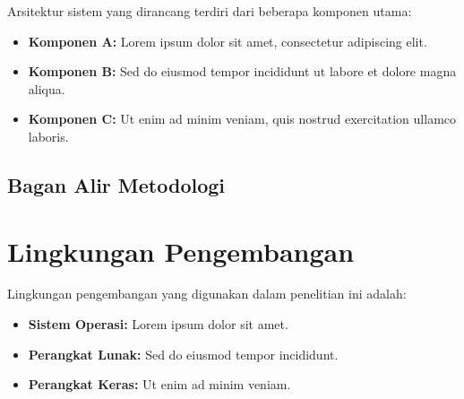 
Arsitektur sistem yang dirancang terdiri dari beberapa komponen utama:

\begin{itemize}
    \item \textbf{Komponen A:} Lorem ipsum dolor sit amet, consectetur adipiscing elit.
    \item \textbf{Komponen B:} Sed do eiusmod tempor incididunt ut labore et dolore magna aliqua.
    \item \textbf{Komponen C:} Ut enim ad minim veniam, quis nostrud exercitation ullamco laboris.
\end{itemize}


\subsection{Bagan Alir Metodologi}



\section{Lingkungan Pengembangan}


Lingkungan pengembangan yang digunakan dalam penelitian ini adalah:

\begin{itemize}
    \item \textbf{Sistem Operasi:} Lorem ipsum dolor sit amet.
    \item \textbf{Perangkat Lunak:} Sed do eiusmod tempor incididunt.
    \item \textbf{Perangkat Keras:} Ut enim ad minim veniam.
\end{itemize}

